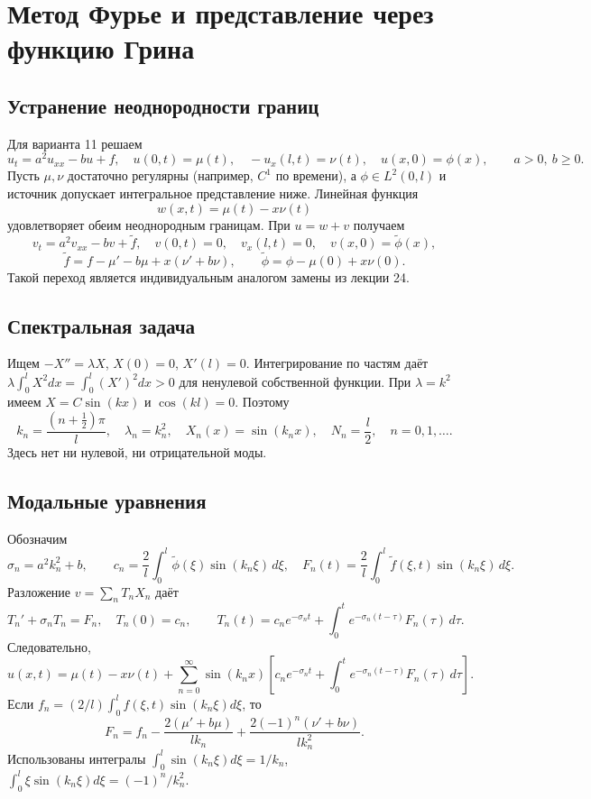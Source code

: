\chapter{Метод Фурье и представление через функцию Грина}
\section{Устранение неоднородности границ}
Для варианта 11 решаем
\[
 u_t=a^2u_{xx}-bu+f,\quad u(0,t)=\mu(t),\quad -u_x(l,t)=\nu(t),
 \quad u(x,0)=\phi(x),\qquad a>0,\ b\ge0.
\]
Пусть $\mu,\nu$ достаточно регулярны (например, $C^1$ по времени),
а $\phi\in L^2(0,l)$ и источник допускает интегральное представление ниже.
Линейная функция
\[
 \boxed{w(x,t)=\mu(t)-x\nu(t)}
\]
удовлетворяет обеим неоднородным границам. При $u=w+v$ получаем
\[
 v_t=a^2v_{xx}-bv+\widetilde f,\quad v(0,t)=0,\quad v_x(l,t)=0,
 \quad v(x,0)=\widetilde\phi(x),
\]
\[
 \widetilde f=f-\mu'-b\mu+x(\nu'+b\nu),
 \qquad \widetilde\phi=\phi-\mu(0)+x\nu(0).
\]
Такой переход является индивидуальным аналогом замены из лекции 24.
\section{Спектральная задача}
Ищем $-X''=\lambda X$, $X(0)=0$, $X'(l)=0$.
Интегрирование по частям даёт
$\lambda\int_0^lX^2dx=\int_0^l(X')^2dx>0$
для ненулевой собственной функции. При $\lambda=k^2$
имеем $X=C\sin(kx)$ и $\cos(kl)=0$. Поэтому
\[
 k_n=\frac{(n+\tfrac12)\pi}{l},\quad \lambda_n=k_n^2,
 \quad X_n(x)=\sin(k_nx),\quad N_n=\frac l2,\quad n=0,1,\ldots.
\]
Здесь нет ни нулевой, ни отрицательной моды.
\section{Модальные уравнения}
Обозначим
\[
 \sigma_n=a^2k_n^2+b,\qquad
 c_n=\frac2l\int_0^l\widetilde\phi(\xi)\sin(k_n\xi)\,d\xi,
\quad F_n(t)=\frac2l\int_0^l\widetilde f(\xi,t)\sin(k_n\xi)\,d\xi.
\]
Разложение $v=\sum_nT_nX_n$ даёт
\[
 T_n'+\sigma_nT_n=F_n,\quad T_n(0)=c_n,
\qquad T_n(t)=c_ne^{-\sigma_nt}+\int_0^te^{-\sigma_n(t-\tau)}F_n(\tau)\,d\tau.
\]
Следовательно,
\[
 \boxed{u(x,t)=\mu(t)-x\nu(t)+\sum_{n=0}^{\infty}\sin(k_nx)
 \left[c_ne^{-\sigma_nt}+\int_0^te^{-\sigma_n(t-\tau)}F_n(\tau)\,d\tau\right].}
\]
Если $f_n=(2/l)\int_0^lf(\xi,t)\sin(k_n\xi)d\xi$, то
\[
 F_n=f_n-\frac{2(\mu'+b\mu)}{lk_n}
       +\frac{2(-1)^n(\nu'+b\nu)}{lk_n^2}.
\]
Использованы интегралы
$\int_0^l\sin(k_n\xi)d\xi=1/k_n$,
$\int_0^l\xi\sin(k_n\xi)d\xi=(-1)^n/k_n^2$.
